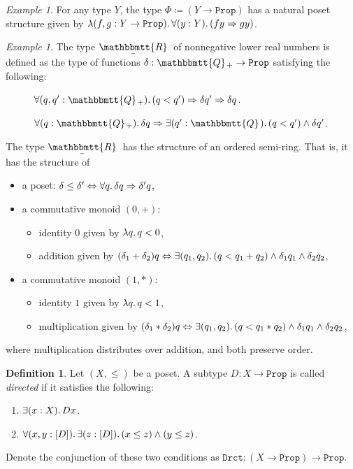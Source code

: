 \documentclass[11pt, oneside, article]{memoir}
\theoremstyle{plain}
\theoremstyle{definition}
\newtheorem{definition}[theorem]{Definition}
\theoremstyle{remark}
\newtheorem{example}[theorem]{Example}
\DeclarePairedDelimiter{\subtype}{[}{]}
\newcommand{\const}[1]{\mathtt{#1}}
\newcommand{\ubar}[1]{\underaccent{\bar}{#1}}
\newcommand{\internal}[1]{\raisebox{-.03ex}{$\mathbbmtt{#1}$}}
\newcommand{\hs}{\hspace{1.1pt}}
\newcommand{\tQQ}{\internal{Q}\hs}
\newcommand{\tQQp}{\tQQ_{+}}
\newcommand{\tRR}{\internal{R}\hs}
\newcommand{\tLR}{\ubar{\tRR}\hs}
\newcommand{\Prop}{\const{Prop}}
\newcommand{\imp}{\Rightarrow}
\renewcommand{\iff}{\Leftrightarrow}
\begin{document}
\begin{example}
For any type $Y$, the type $\Phi\coloneqq (Y\to\Prop)$ has a natural poset structure given by $\lambda(f,g:Y\to\Prop)\ldotp\forall(y:Y)\ldotp (fy\imp gy)$.
\end{example}

\begin{example}
The type $\tLR$ of nonnegative lower real numbers is defined as the type of functions $\delta:\tQQp\to\Prop$ satisfying the following:
\begin{description}
	\item[\quad\parbox{1in}{Down-closed:}] $\forall(q,q':\tQQp)\ldotp (q<q')\imp\delta q'\imp\delta q$.
	\item[\quad\parbox{1in}{Rounded:}] $\forall(q:\tQQp)\ldotp\delta q\imp\exists(q':\tQQ)\ldotp(q<q')\wedge\delta q'$.
\end{description}
The type $\tLR$ has the structure of an ordered semi-ring. That is, it has the structure of
\begin{itemize}
	\item a poset: $\delta\leq \delta'\iff\forall q\ldotp\delta q\imp\delta'q$,
	\item a commutative monoid $(0,+)$:
	\begin{itemize}
		\item identity $0$ given by $\lambda q\ldotp q < 0$,
		\item  addition given by $(\delta_1+\delta_2)q\iff\exists(q_1,q_2)\ldotp(q<q_1+q_2)\wedge\delta_1q_1\wedge\delta_2q_2$,
	\end{itemize}
	\item a commutative monoid $(1,*)$:
	\begin{itemize}
		\item identity $1$ given by $\lambda q\ldotp q<1$,
		\item multiplication given by $(\delta_1*\delta_2)q\iff\exists(q_1,q_2)\ldotp(q<q_1*q_2)\wedge\delta_1q_1\wedge\delta_2q_2$,
	\end{itemize}
\end{itemize}
where multiplication distributes over addition, and both preserve order.
\end{example}

\begin{definition}
Let $(X,\leq)$ be a poset. A subtype $D:X\to\Prop$ is called \emph{directed} if it satisfies the following:
\begin{enumerate}
	\item $\exists(x:X)\ldotp Dx$.
	\item $\forall(x,y:\subtype{D})\ldotp\exists(z:\subtype{D})\ldotp(x\leq z)\wedge (y\leq z)$.
\end{enumerate}
Denote the conjunction of these two conditions as $\const{Drct}:(X\to\Prop)\to\Prop$.
\end{definition}
\end{document}
